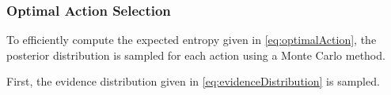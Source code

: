             


            \subsubsection{Optimal Action Selection}

                To efficiently compute the expected entropy given in \eqref{eq:optimalAction}, the posterior distribution is sampled for each action using a Monte Carlo method. 

                First, the evidence distribution given in \eqref{eq:evidenceDistribution} is sampled.

